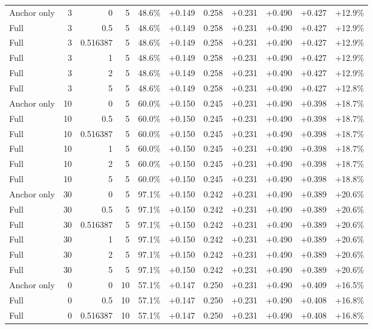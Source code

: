 \begin{table}[htbp]
\begin{tabular}{lrrrccccccc}
Anchor only & 3 & 0 & 5 & 48.6\% & +0.149 & 0.258 & +0.231 & +0.490 & +0.427 & +12.9\% \\
Full & 3 & 0.5 & 5 & 48.6\% & +0.149 & 0.258 & +0.231 & +0.490 & +0.427 & +12.9\% \\
Full & 3 & 0.516387 & 5 & 48.6\% & +0.149 & 0.258 & +0.231 & +0.490 & +0.427 & +12.9\% \\
Full & 3 & 1 & 5 & 48.6\% & +0.149 & 0.258 & +0.231 & +0.490 & +0.427 & +12.9\% \\
Full & 3 & 2 & 5 & 48.6\% & +0.149 & 0.258 & +0.231 & +0.490 & +0.427 & +12.9\% \\
Full & 3 & 5 & 5 & 48.6\% & +0.149 & 0.258 & +0.231 & +0.490 & +0.427 & +12.8\% \\
Anchor only & 10 & 0 & 5 & 60.0\% & +0.150 & 0.245 & +0.231 & +0.490 & +0.398 & +18.7\% \\
Full & 10 & 0.5 & 5 & 60.0\% & +0.150 & 0.245 & +0.231 & +0.490 & +0.398 & +18.7\% \\
Full & 10 & 0.516387 & 5 & 60.0\% & +0.150 & 0.245 & +0.231 & +0.490 & +0.398 & +18.7\% \\
Full & 10 & 1 & 5 & 60.0\% & +0.150 & 0.245 & +0.231 & +0.490 & +0.398 & +18.7\% \\
Full & 10 & 2 & 5 & 60.0\% & +0.150 & 0.245 & +0.231 & +0.490 & +0.398 & +18.7\% \\
Full & 10 & 5 & 5 & 60.0\% & +0.150 & 0.245 & +0.231 & +0.490 & +0.398 & +18.8\% \\
Anchor only & 30 & 0 & 5 & 97.1\% & +0.150 & 0.242 & +0.231 & +0.490 & +0.389 & +20.6\% \\
Full & 30 & 0.5 & 5 & 97.1\% & +0.150 & 0.242 & +0.231 & +0.490 & +0.389 & +20.6\% \\
Full & 30 & 0.516387 & 5 & 97.1\% & +0.150 & 0.242 & +0.231 & +0.490 & +0.389 & +20.6\% \\
Full & 30 & 1 & 5 & 97.1\% & +0.150 & 0.242 & +0.231 & +0.490 & +0.389 & +20.6\% \\
Full & 30 & 2 & 5 & 97.1\% & +0.150 & 0.242 & +0.231 & +0.490 & +0.389 & +20.6\% \\
Full & 30 & 5 & 5 & 97.1\% & +0.150 & 0.242 & +0.231 & +0.490 & +0.389 & +20.6\% \\
Anchor only & 0 & 0 & 10 & 57.1\% & +0.147 & 0.250 & +0.231 & +0.490 & +0.409 & +16.5\% \\
Full & 0 & 0.5 & 10 & 57.1\% & +0.147 & 0.250 & +0.231 & +0.490 & +0.408 & +16.8\% \\
Full & 0 & 0.516387 & 10 & 57.1\% & +0.147 & 0.250 & +0.231 & +0.490 & +0.408 & +16.8\% \\

\end{tabular}
\end{table}
